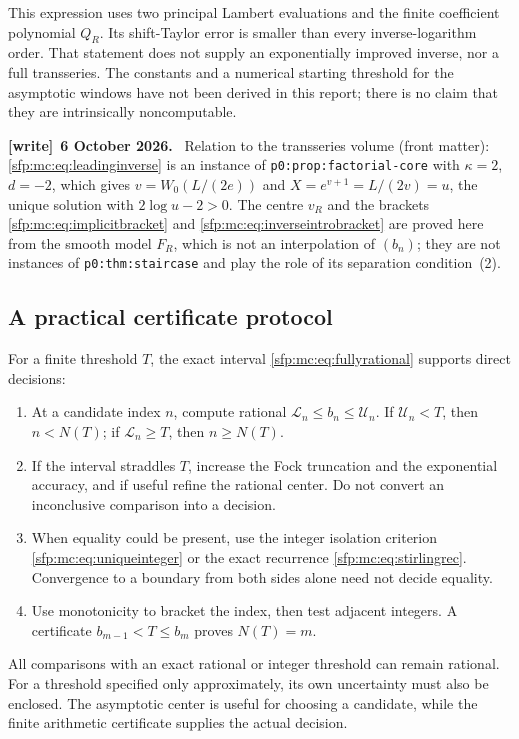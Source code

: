 \documentclass[11pt,letterpaper]{article}
\numberwithin{equation}{section}
\theoremstyle{definition}\newtheorem{definition}[theorem]{Definition}
\theoremstyle{remark}\newtheorem{remark}[theorem]{Remark}
\newcommand{\file}[1]{\nolinkurl{#1}}
\newenvironment{writenote}[1][]{\par\smallskip\begingroup\small
 \noindent\textbf{[write]}\if\relax\detokenize{#1}\relax\else~\textbf{#1.}\fi\ }%
 {\par\endgroup\smallskip}
\begin{document}
This expression uses two principal Lambert evaluations and the
finite coefficient polynomial $Q_R$. Its shift-Taylor error is
smaller than every inverse-logarithm order. That statement does
not supply an exponentially improved inverse, nor a full
transseries. The constants and a numerical starting threshold
for the asymptotic windows have not been derived in this report;
there is no claim that they are intrinsically noncomputable.
\begin{writenote}[6 October 2026]
Relation to the transseries volume \cite{TSvol} (front matter): \eqref{sfp:mc:eq:leadinginverse} is an instance of \file{p0:prop:factorial-core} with $\kappa=2$, $d=-2$, which gives $v=W_0(L/(2e))$ and $X=e^{v+1}=L/(2v)=u$, the unique solution with $2\log u-2>0$. The centre $v_R$ and the brackets \eqref{sfp:mc:eq:implicitbracket} and \eqref{sfp:mc:eq:inverseintrobracket} are proved here from the smooth model $F_R$, which is not an interpolation of $(b_n)$; they are not instances of \file{p0:thm:staircase} and play the role of its separation condition~(2).
\end{writenote}

\subsection{A practical certificate protocol}\label{sfp:mc:sub:protocol}
For a finite threshold $T$, the exact interval
\eqref{sfp:mc:eq:fullyrational} supports direct decisions:
\begin{enumerate}
\item At a candidate index $n$, compute rational
$\mathcal L_n\leq b_n\leq\mathcal U_n$. If
$\mathcal U_n<T$, then $n<N(T)$; if
$\mathcal L_n\geq T$, then $n\geq N(T)$.
\item If the interval straddles $T$, increase the Fock truncation
and the exponential accuracy, and if useful refine the rational
center. Do not convert an inconclusive comparison into a decision.
\item When equality could be present, use the integer isolation
criterion \eqref{sfp:mc:eq:uniqueinteger} or the exact recurrence
\eqref{sfp:mc:eq:stirlingrec}. Convergence to a boundary from both sides
alone need not decide equality.
\item Use monotonicity to bracket the index, then test adjacent
integers. A certificate $b_{m-1}<T\leq b_m$ proves $N(T)=m$.
\end{enumerate}
All comparisons with an exact rational or integer threshold can
remain rational. For a threshold specified only approximately,
its own uncertainty must also be enclosed. The asymptotic center
is useful for choosing a candidate, while the finite arithmetic
certificate supplies the actual decision.
\end{document}
